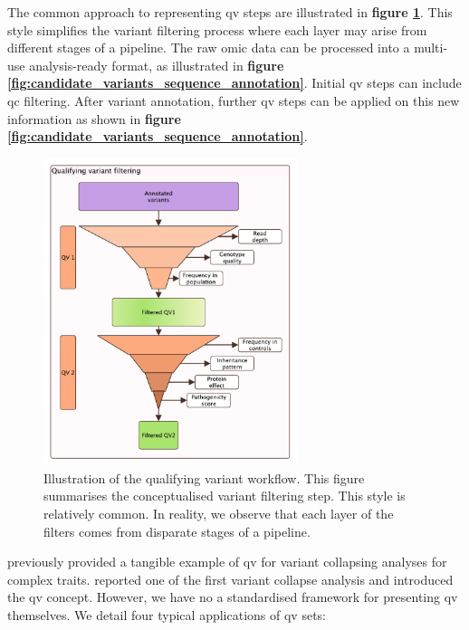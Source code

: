 The common approach to representing \ac{qv} steps are illustrated in 
\textbf{figure \ref{fig:qv_filter_pyramid_vcurrent}}.
This style simplifies the variant filtering process where each layer may arise from different stages of a pipeline.
The raw omic data can be processed into a multi-use analysis-ready format, as illustrated in 
\textbf{figure 
\ref{fig:candidate_variants_sequence_annotation}}.
Initial \ac{qv} steps can include \ac{qc} filtering. 
After variant annotation, further \ac{qv} steps can be applied on this new information as shown in 
\textbf{figure
\ref{fig:candidate_variants_sequence_annotation}}.
 
\begin{figure}
\centering
     \includegraphics[width=0.66\textwidth]{./images/qv_filter_pyramid_vcurrent.pdf}
\caption{Illustration of the qualifying variant workflow. This figure summarises the conceptualised variant filtering step. This style is relatively common. In reality, we observe that each layer of the filters comes from disparate stages of a pipeline.}
    \label{fig:qv_filter_pyramid_vcurrent}
\end{figure}

\citet{povysil2019rare} previously provided a tangible example of \ac{qv} for variant collapsing analyses for complex traits. 
\citet{cirulli2015exome} reported one of the first variant collapse analysis and introduced the \ac{qv} concept.
However, we have no a standardised framework for presenting \ac{qv} themselves. 
We detail four typical applications of \ac{qv} sets:


